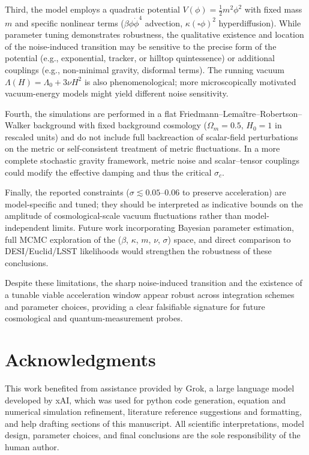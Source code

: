 \documentclass[preprint]{aastex7}
\begin{document}
Third, the model employs a quadratic potential \( V(\phi) = \frac{1}{2} m^2 \phi^2 \) with fixed mass \( m \) and specific nonlinear terms (\( \beta \phi \dot{\phi}^4 \) advection, \( \kappa (\square \phi)^2 \) hyperdiffusion). While parameter tuning demonstrates robustness, the qualitative existence and location of the noise-induced transition may be sensitive to the precise form of the potential (e.g., exponential, tracker, or hilltop quintessence) or additional couplings (e.g., non-minimal gravity, disformal terms). The running vacuum \( \Lambda(H) = \Lambda_0 + 3\nu H^2 \) is also phenomenological; more microscopically motivated vacuum-energy models might yield different noise sensitivity.

Fourth, the simulations are performed in a flat Friedmann--Lema\^{i}tre--Robertson--Walker background with fixed background cosmology (\( \Omega_m = 0.5 \), \( H_0 = 1 \) in rescaled units) and do not include full backreaction of scalar-field perturbations on the metric or self-consistent treatment of metric fluctuations. In a more complete stochastic gravity framework, metric noise and scalar--tensor couplings could modify the effective damping and thus the critical \( \sigma_c \).

Finally, the reported constraints (\( \sigma \lesssim 0.05 \)--$0.06$ to preserve acceleration) are model-specific and tuned; they should be interpreted as indicative bounds on the amplitude of cosmological-scale vacuum fluctuations rather than model-independent limits. Future work incorporating Bayesian parameter estimation, full MCMC exploration of the (\( \beta \), \( \kappa \), \( m \), \( \nu \), \( \sigma \)) space, and direct comparison to DESI/Euclid/LSST likelihoods would strengthen the robustness of these conclusions.

Despite these limitations, the sharp noise-induced transition and the existence of a tunable viable acceleration window appear robust across integration schemes and parameter choices, providing a clear falsifiable signature for future cosmological and quantum-measurement probes.

\section*{Acknowledgments}

This work benefited from assistance provided by Grok, a large language model developed by xAI, which was used for python code generation, equation and numerical simulation refinement, literature reference suggestions and formatting, and help drafting sections of this manuscript. All scientific interpretations, model design, parameter choices, and final conclusions are the sole responsibility of the human author.



\nocite{Thornton2026a}
\nocite{CalzettaVerdaguer1999}
\nocite{MartinRingeval2005}
\nocite{Alimi2010}
\end{document}
